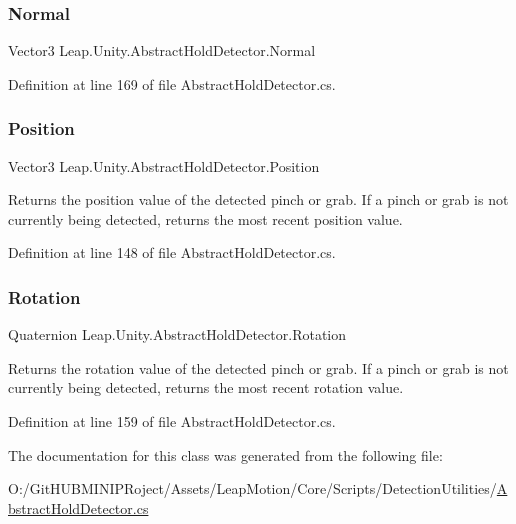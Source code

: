 \subsubsection{\texorpdfstring{Normal}{Normal}}
{\footnotesize\ttfamily Vector3 Leap.\+Unity.\+Abstract\+Hold\+Detector.\+Normal\hspace{0.3cm}{\ttfamily [get]}}



Definition at line 169 of file Abstract\+Hold\+Detector.\+cs.

\mbox{\label{class_leap_1_1_unity_1_1_abstract_hold_detector_ab446401a8797499aaf287378f61aa08c}} 
\subsubsection{\texorpdfstring{Position}{Position}}
{\footnotesize\ttfamily Vector3 Leap.\+Unity.\+Abstract\+Hold\+Detector.\+Position\hspace{0.3cm}{\ttfamily [get]}}



Returns the position value of the detected pinch or grab. If a pinch or grab is not currently being detected, returns the most recent position value. 



Definition at line 148 of file Abstract\+Hold\+Detector.\+cs.

\mbox{\label{class_leap_1_1_unity_1_1_abstract_hold_detector_adab4911135d0c091a66cbe7498dbeac5}} 
\subsubsection{\texorpdfstring{Rotation}{Rotation}}
{\footnotesize\ttfamily Quaternion Leap.\+Unity.\+Abstract\+Hold\+Detector.\+Rotation\hspace{0.3cm}{\ttfamily [get]}}



Returns the rotation value of the detected pinch or grab. If a pinch or grab is not currently being detected, returns the most recent rotation value. 



Definition at line 159 of file Abstract\+Hold\+Detector.\+cs.



The documentation for this class was generated from the following file\+:\begin{DoxyCompactItemize}
\item 
O\+:/\+Git\+H\+U\+B\+M\+I\+N\+I\+P\+Roject/\+Assets/\+Leap\+Motion/\+Core/\+Scripts/\+Detection\+Utilities/\mbox{\hyperlink{_abstract_hold_detector_8cs}{Abstract\+Hold\+Detector.\+cs}}\end{DoxyCompactItemize}
